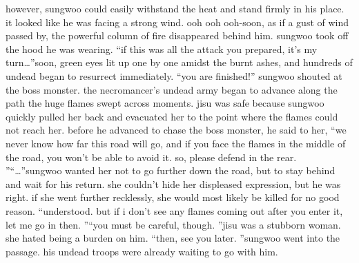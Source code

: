 however, sungwoo could easily withstand the heat and stand firmly in his place.
 it looked like he was facing a strong wind.
ooh ooh ooh-soon, as if a gust of wind passed by, the powerful column of fire disappeared behind him.
sungwoo took off the hood he was wearing.
“if this was all the attack you prepared, it’s my turn…”soon, green eyes lit up one by one amidst the burnt ashes, and hundreds of undead began to resurrect immediately.
“you are finished!” sungwoo shouted at the boss monster.
the necromancer’s undead army began to advance along the path the huge flames swept across moments.
jisu was safe because sungwoo quickly pulled her back and evacuated her to the point where the flames could not reach her.
before he advanced to chase the boss monster, he said to her, “we never know how far this road will go, and if you face the flames in the middle of the road, you won’t be able to avoid it.
 so, please defend in the rear.
”“…”sungwoo wanted her not to go further down the road, but to stay behind and wait for his return.
she couldn’t hide her displeased expression, but he was right.
 if she went further recklessly, she would most likely be killed for no good reason.
“understood.
 but if i don’t see any flames coming out after you enter it, let me go in then.
”“you must be careful, though.
”jisu was a stubborn woman.
 she hated being a burden on him.
“then, see you later.
”sungwoo went into the passage.
 his undead troops were already waiting to go with him.


 
